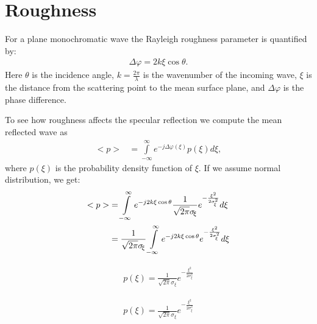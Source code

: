 
\newpage

\section{Roughness}

For a plane monochromatic wave the Rayleigh roughness parameter is quantified by:
\begin{align}
\Delta\varphi = 2k\xi\cos\theta.
\end{align}
Here $\theta$ is the incidence angle, $k = \frac{2\pi}{\lambda}$ is the wavenumber of the incoming wave, $\xi$ is the distance from the scattering point to the mean surface plane, and $\Delta\varphi$ is the phase difference.

\begin{figure}[th]
\end{figure}

To see how roughness affects the specular reflection we compute the mean reflected wave as
\begin{align}
<p> &= \int\limits_{-\infty}^{\infty} e^{-j\Delta\varphi(\xi)} p(\xi) d\xi,
\end{align}
where $p(\xi)$ is the probability density function of $\xi$. If we assume normal distribution, we get:
\begin{align}
<p> &= \int\limits_{-\infty}^{\infty} e^{-j2k\xi\cos\theta} \frac{1}{\sqrt{2\pi}\sigma_{\!\xi}}e^{-\frac{\xi^2}{2\sigma_{\!\xi}^2}} d\xi \nonumber\\
&= \frac{1}{\sqrt{2\pi}\sigma_{\!\xi}} \int\limits_{-\infty}^{\infty} e^{-j2k\xi\cos\theta} e^{-\frac{\xi^2}{2\sigma_{\!\xi}^2}} d\xi \nonumber\\
\end{align}

\begin{align}
p(\xi) = \frac{1}{\sqrt{2\pi}\sigma_{\!\xi}}e^{-\frac{\xi^2}{2\sigma_{\!\xi}^2}}
\end{align}


\begin{align}
p(\xi) = \frac{1}{\sqrt{2\pi}\sigma_{\!\xi}}e^{-\frac{\xi^2}{2\sigma_{\!\xi}^2}}
\end{align}


